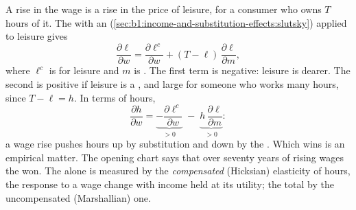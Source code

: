 A rise in the wage is a rise in the price of leisure, for a consumer who
owns $T$ hours of it. The  with an 
(\cref{sec:b1:income-and-substitution-effects:slutsky}) applied to leisure
gives
\[
\frac{\partial\ell}{\partial w} = \frac{\partial\ell^{c}}{\partial w} + (T - \ell)\,\frac{\partial\ell}{\partial m},
\]
where $\ell^{c}$ is  for leisure and $m$ is . The
first term is negative: leisure is dearer. The second is positive if
leisure is a , and large for someone who works many hours,
since $T - \ell = h$. In terms of hours,
\[
\frac{\partial h}{\partial w} = \underbrace{-\frac{\partial\ell^{c}}{\partial w}}_{> 0}\;-\;\underbrace{h\,\frac{\partial\ell}{\partial m}}_{> 0}:
\]
a wage rise pushes hours up by substitution and down by the .
Which wins is an empirical matter. The opening chart says that over
seventy years of rising wages the  won. The 
alone is measured by the \emph{compensated} (Hicksian) elasticity of hours,
the response to a wage change with income held at its utility; the total by
the uncompensated (Marshallian) one.


